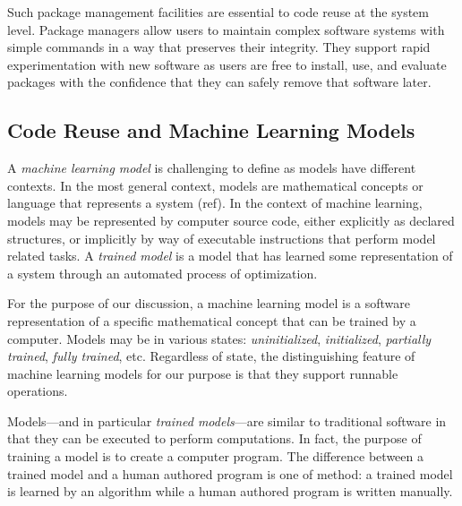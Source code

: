 \documentclass{article}
\begin{document}
Such package management facilities are essential to code reuse at the
system level. Package managers allow users to maintain complex
software systems with simple commands in a way that preserves their
integrity. They support rapid experimentation with new software as
users are free to install, use, and evaluate packages with the
confidence that they can safely remove that software later.

\iffalse
Package managers promote healthy software ecosystems by facilitating
software \emph{publishing}. Software authors use packaging tools to
create the installable software units---\emph{packages}---that are so
easily consumed by users. By publishing packaged software, developers
signify that their software will work as advertised if installed using
the applicable tools.

Software ecosystems that are enabled by package managers include
Python, JavaScript, Ruby, Go, and R. The GNU/Linux operating system
itself is an ecosystem of package management ecosystems including
packaging schemes from Debian, RedHat, Gentoo, and Arch
distributions. Package managers are established cornerstones of
software reuse across languages and operating systems.
\fi

\subsection{Code Reuse and Machine Learning Models}

A \emph{machine learning model} is challenging to define as models
have different contexts. In the most general context, models are
mathematical concepts or language that represents a system (ref). In
the context of machine learning, models may be represented by computer
source code, either explicitly as declared structures, or implicitly
by way of executable instructions that perform model related tasks. A
\emph{trained model} is a model that has learned some representation
of a system through an automated process of optimization.

For the purpose of our discussion, a machine learning model is a
software representation of a specific mathematical concept that can be
trained by a computer. Models may be in various states:
\emph{uninitialized}, \emph{initialized}, \emph{partially trained},
\emph{fully trained}, etc. Regardless of state, the distinguishing
feature of machine learning models for our purpose is that they
support runnable operations.

Models---and in particular \emph{trained models}---are similar to
traditional software in that they can be executed to perform
computations. In fact, the purpose of training a model is to create a
computer program. The difference between a trained model and a human
authored program is one of method: a trained model is learned by an
algorithm while a human authored program is written manually.
\end{document}
